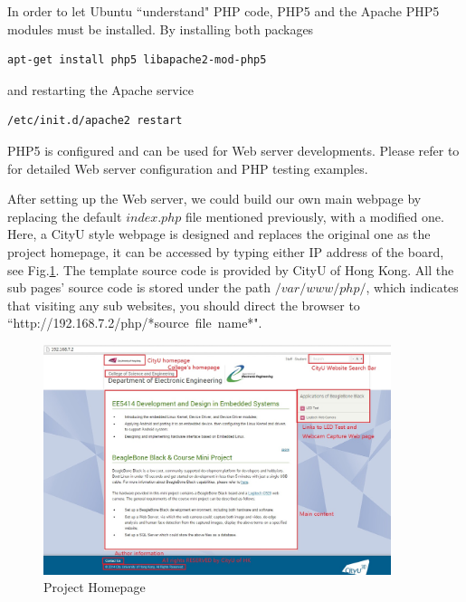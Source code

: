 \documentclass[12pt,journal,draftclsnofoot,onecolumn]{IEEEtran}
\begin{document}
In order to let Ubuntu  ``understand" PHP code, PHP5 and the Apache PHP5 modules must be installed. By installing both packages
\begin{lstlisting}[language={bash}]
apt-get install php5 libapache2-mod-php5
\end{lstlisting}
and restarting the Apache service
\begin{lstlisting}[language={bash}]
/etc/init.d/apache2 restart
\end{lstlisting}
PHP5 is configured and can be used for Web server developments. Please refer to \cite{Apache1} for detailed Web server configuration and PHP testing examples.

After setting up the Web server, we could build our own main webpage by replacing the default $index.php$ file mentioned previously, with a modified one. Here, a CityU style webpage is designed and replaces the original one as the project homepage, it can be accessed by typing either IP address of the board, see Fig.\ref{mainpage}. The template source code is provided by CityU of Hong Kong. All the sub pages' source code is stored under the path $/var/www/php/$, which indicates that visiting any sub websites, you should direct the browser to ``http://192.168.7.2/php/*source\ file\ name*".
\begin{figure}[htb]
	\centering
	\includegraphics[width=4in]{./figs/mainpage.jpg}
	\caption{Project Homepage}
	\label{mainpage}
\end{figure}
	
\end{document}
